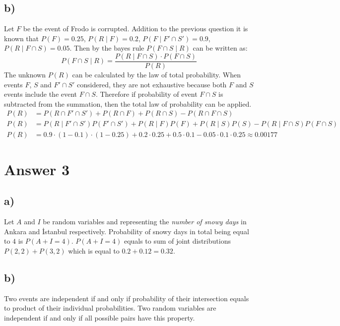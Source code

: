 \documentclass[12pt]{article}
\begin{document}
\subsection*{b)}
Let $F$ be the event of Frodo is corrupted. Addition to the previous question it is known that $P(F) = 0.25$, $P(R \mid F) = 0.2$, $P(F \mid F' \cap S') = 0.9$, $P(R \mid F \cap S) = 0.05$. Then by the bayes rule $P(F \cap S \mid R)$ can be written as:
\begin{equation*}
    P(F \cap S \mid R) = \frac{P(R \mid F \cap S) \cdot P(F \cap S)}{P(R)}
\end{equation*} 
The unknown $P(R)$ can be calculated by the law of total probability. When events $F$, $S$ and $F' \cap S'$ considered, they are not exhaustive because both $F$ and $S$ events include the event $F \cap S$. Therefore if probability of event $F \cap S$ is subtracted from the summation, then the total law of probability can be applied.
\begin{align*}
    P(R) &= P(R \cap F' \cap S') + P(R \cap F) + P(R \cap S) - P(R \cap F \cap S)\\
    P(R) &= P(R \mid F' \cap S')P(F' \cap S') + P(R \mid F)P(F) + P(R \mid S)P(S) - P(R \mid F \cap S)P(F \cap S)\\
    P(R) &= 0.9 \cdot (1-0.1) \cdot (1-0.25) + 0.2 \cdot 0.25+0.5 \cdot 0.1-0.05 \cdot 0.1 \cdot 0.25 \approx 0.00177
\end{align*}
\section*{Answer 3}
\subsection*{a)}
Let $A$ and $I$ be random variables and representing the \emph{number of snowy days} in Ankara and İstanbul respectively. Probability of snowy days in total being equal to $4$ is $P(A+I=4)$. $P(A+I=4)$ equals to sum of joint distributions $P(2,2) + P(3,2)$ which is equal to $0.2 + 0.12 = 0.32$.
\subsection*{b)}
Two events are independent if and only if probability of their intersection equals to product of their individual probabilities. Two random variables are independent if and only if all possible pairs have this property.
\end{document}
